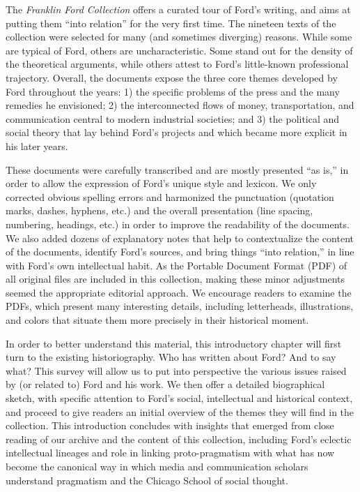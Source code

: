 \documentclass[openany,nobib]{tufte-book}
\begin{document}
The \emph{Franklin Ford Collection} offers a curated tour of Ford's
writing, and aims at putting them ``into relation'' for the very first
time. The nineteen texts of the collection were selected for many (and
sometimes diverging) reasons. While some are typical of Ford, others are
uncharacteristic. Some stand out for the density of the theoretical
arguments, while others attest to Ford's little-known professional
trajectory. Overall, the documents expose the three core themes
developed by Ford throughout the years: 1) the specific problems of the
press and the many remedies he envisioned; 2) the interconnected flows
of money, transportation, and communication central to modern industrial
societies; and 3) the political and social theory that lay behind Ford's
projects and which became more explicit in his later years.

These documents were carefully transcribed and are mostly presented ``as
is,'' in order to allow the expression of Ford's unique style and
lexicon. We only corrected obvious spelling errors and harmonized the
punctuation (quotation marks, dashes, hyphens, etc.) and the overall
presentation (line spacing, numbering, headings, etc.) in order to
improve the readability of the documents. We also added dozens of
explanatory notes that help to contextualize the content of the
documents, identify Ford's sources, and bring things ``into relation,''
in line with Ford's own intellectual habit. As the Portable Document
Format (PDF) of all original files are included in this collection,
making these minor adjustments seemed the appropriate editorial
approach. We encourage readers to examine the PDFs, which present many
interesting details, including letterheads, illustrations, and colors
that situate them more precisely in their historical moment.

In order to better understand this material, this introductory chapter
will first turn to the existing historiography. Who has written about
Ford? And to say what? This survey will allow us to put into perspective
the various issues raised by (or related to) Ford and his work. We then
offer a detailed biographical sketch, with specific attention to Ford's
social, intellectual and historical context, and proceed to give readers
an initial overview of the themes they will find in the collection. This
introduction concludes with insights that emerged from close reading of
our archive and the content of this collection, including Ford's
eclectic intellectual lineages and role in linking proto-pragmatism with
what has now become the canonical way in which media and communication
scholars understand pragmatism and the Chicago School of social thought.
\end{document}
